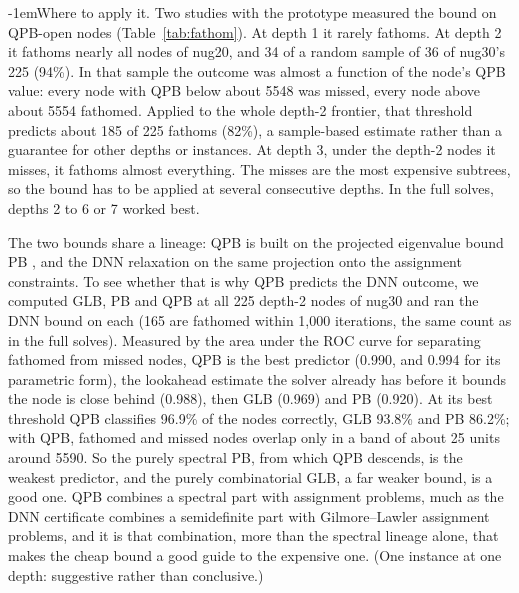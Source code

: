 \documentclass[10pt]{article}
\makeatletter
\renewcommand\paragraph{\@startsection{paragraph}{4}{\z@}{2.5ex plus 1ex minus .2ex}%
  {-1em}{\normalfont\normalsize\bfseries}}
\theoremstyle{remark}
\makeatother
\begin{document}
\paragraph{Where to apply it.} Two studies with the prototype measured the bound on
QPB-open nodes (Table~\ref{tab:fathom}). At depth 1 it rarely fathoms. At depth 2 it
fathoms nearly all nodes of nug20, and 34 of a random sample of 36 of nug30's 225
(94\%). In that sample the outcome was almost a function of the node's QPB value:
every node with QPB below about 5548 was missed, every node above about 5554
fathomed. Applied to the whole depth-2 frontier, that threshold predicts about 185
of 225 fathoms (82\%), a sample-based estimate rather than a guarantee for other
depths or instances. At depth 3, under the depth-2 nodes it misses, it fathoms
almost everything. The misses are the most expensive subtrees, so the bound has to
be applied at several consecutive depths. In the full solves, depths 2 to 6 or 7
worked best.

The two bounds share a lineage: QPB is built on the projected eigenvalue bound PB
\cite{hrw}, and the DNN relaxation on the same projection onto the assignment
constraints. To see whether that is why QPB predicts the DNN outcome, we computed
GLB, PB and QPB at all 225 depth-2 nodes of nug30 and ran the DNN bound on each
(165 are fathomed within 1,000 iterations, the same count as in the full solves).
Measured by the area under the ROC curve for separating fathomed from missed
nodes, QPB is the best predictor (0.990, and 0.994 for its parametric form), the
lookahead estimate the solver already has before it bounds the node is close
behind (0.988), then GLB (0.969) and PB (0.920). At its best threshold QPB classifies
96.9\% of the nodes correctly, GLB 93.8\% and PB 86.2\%; with QPB, fathomed and
missed nodes overlap only in a band of about 25 units around 5590. So the purely
spectral PB, from which QPB descends, is the weakest predictor, and the purely
combinatorial GLB, a far weaker bound, is a good one. QPB combines a spectral part
with assignment problems, much as the DNN certificate combines a semidefinite part
with Gilmore--Lawler assignment problems, and it is that combination, more than the
spectral lineage alone, that makes the cheap bound a good guide to the expensive
one. (One instance at one depth: suggestive rather than conclusive.)
\end{document}
